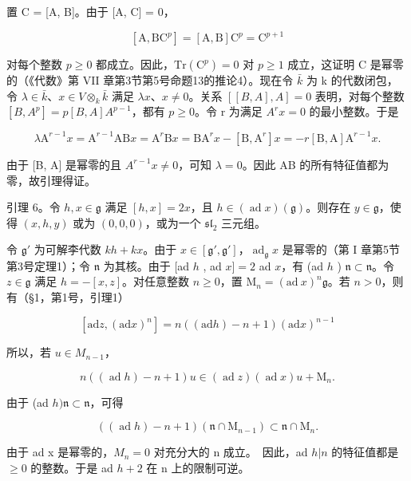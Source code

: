 置 C = {[}A, B{]}。由于 {[}A, C{]} = 0，

\[
[ \mathrm{A}, \mathrm{BC} ^ {p} ] = [ \mathrm{A}, \mathrm{B} ] \mathrm{C} ^ {p} = \mathrm{C} ^ {p + 1}
\]

对每个整数 \(p \geq 0\) 都成立。因此，\(\mathrm{Tr}(\mathrm{C}^{p}) = 0\) 对 \(p \geq 1\) 成立，这证明 C 是幂零的（《代数》第 VII 章第3节第5号命题13的推论4）。现在令 \(\bar{k}\) 为 k 的代数闭包，令 \(\lambda \in \bar{k}\)、\(x \in V \otimes_{k} \bar{k}\) 满足 \(\lambda x\)、\(x \neq 0\)。关系 \([[B, A], A] = 0\) 表明，对每个整数 \([B, A^{p}] = p[B, A]A^{p-1}\)，都有 \(p \geq 0\)。令 r 为满足 \(A^{r}x = 0\) 的最小整数。于是

\[
\lambda \mathrm{A} ^ {r - 1} x = \mathrm{A} ^ {r - 1} \mathrm{AB} x = \mathrm{A} ^ {r} \mathrm{B} x = \mathrm{BA} ^ {r} x - [ \mathrm{B}, \mathrm{A} ^ {r} ] x = - r [ \mathrm{B}, \mathrm{A} ] \mathrm{A} ^ {r - 1} x.
\]

由于 {[}B, A{]} 是幂零的且 \(A^{r-1}x \neq 0\)，可知 \(\lambda = 0\)。因此 AB 的所有特征值都为零，故引理得证。

引理 6。令 \(h, x \in \mathfrak{g}\) 满足 \([h, x] = 2x\)，且 \(h \in (\operatorname{ad} x)(\mathfrak{g})\)。则存在 \(y \in \mathfrak{g}\)，使得 \((x, h, y)\) 或为 \((0, 0, 0)\)，或为一个 \(\mathfrak{sl}_2\) 三元组。

令 \(\mathfrak{g}'\) 为可解李代数 \(kh + kx\)。由于 \(x \in [\mathfrak{g}', \mathfrak{g}']\)，\(\operatorname{ad}_{\mathfrak{g}} x\) 是幂零的（第 I 章第5节第3号定理1）；令 \(\mathfrak{n}\) 为其核。由于 {[}ad \(h\) , ad \(x] = 2\) ad \(x\)，有 (ad \(h\) ) \(\mathfrak{n} \subset \mathfrak{n}\)。令 \(z \in \mathfrak{g}\) 满足 \(h = -[x, z]\)。对任意整数 \(n \geq 0\)，置 \(\mathrm{M}_n = (\mathrm{ad}~x)^n\mathfrak{g}\)。若 \(n > 0\)，则有（§1，第1号，引理1）

\[
[ \mathrm{ad} z, (\mathrm{ad} x) ^ {n} ] = n ((\mathrm{ad} h) - n + 1) (\mathrm{ad} x) ^ {n - 1}
\]

所以，若 \(u \in M_{n-1}\)，

\[
n ((\operatorname{ad} h) - n + 1) u \in (\operatorname{ad} z) (\operatorname{ad} x) u + \mathrm{M} _ {n}.
\]

由于 (ad \(h)\mathfrak{n}\subset \mathfrak{n}\)，可得

\[
((\operatorname{ad} h) - n + 1) (\mathfrak {n} \cap \mathrm{M} _ {n - 1}) \subset \mathfrak {n} \cap \mathrm{M} _ {n}.
\]

由于 ad x 是幂零的，\(M_{n} = 0\) 对充分大的 n 成立。~因此，ad \(h|n\) 的特征值都是 \(\geq 0\) 的整数。于是 ad \(h + 2\) 在 n 上的限制可逆。

